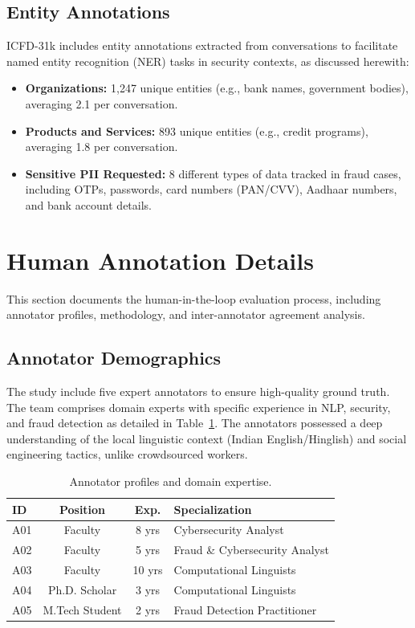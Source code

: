 \documentclass{article}
\begin{document}
\subsection{Entity Annotations}

ICFD-31k includes entity annotations extracted from conversations to facilitate named entity recognition (NER) tasks in security contexts, as discussed herewith:

\begin{itemize}
    \item \textbf{Organizations:} 1,247 unique entities (e.g., bank names, government bodies), averaging 2.1 per conversation.
    \item \textbf{Products and Services:} 893 unique entities (e.g., credit programs), averaging 1.8 per conversation.
    \item \textbf{Sensitive PII Requested:} 8 different types of data tracked in fraud cases, including OTPs, passwords, card numbers (PAN/CVV), Aadhaar numbers, and bank account details.
\end{itemize}

\section{Human Annotation Details}
\label{app:annotation}

This section documents the human-in-the-loop evaluation process, including annotator profiles, methodology, and inter-annotator agreement analysis.

\subsection{Annotator Demographics}

The study include five expert annotators to ensure high-quality ground truth. The team comprises domain experts with specific experience in NLP, security, and fraud detection as detailed in Table~\ref{tab:annotator_profiles}. The annotators possessed a deep understanding of the local linguistic context (Indian English/Hinglish) and social engineering tactics, unlike crowdsourced workers.

\begin{table}[h!]
\centering
\begin{tabular}{@{}lccl@{}}
\toprule
\textbf{ID} & \textbf{Position} & \textbf{Exp.} & \textbf{Specialization} \\ \midrule
A01 & Faculty & 8 yrs & Cybersecurity Analyst \\
A02 & Faculty & 5 yrs & Fraud \& Cybersecurity Analyst \\
A03 & Faculty & 10 yrs & Computational Linguists \\
A04 & Ph.D. Scholar & 3 yrs & Computational Linguists \\
A05 & M.Tech Student & 2 yrs & Fraud Detection Practitioner \\
\bottomrule
\end{tabular}
\caption{Annotator profiles and domain expertise.}
\label{tab:annotator_profiles}
\end{table}
\end{document}
